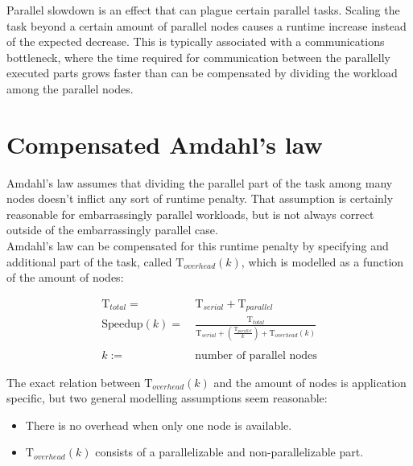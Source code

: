 \hspace{4mm} Parallel slowdown is an effect that can plague certain parallel tasks.\autocite[]{wiki_parsl} Scaling the task beyond a certain amount of parallel nodes causes a runtime increase instead of the expected decrease. This is typically associated with a communications bottleneck, where the time required for communication between the parallelly executed parts grows faster than can be compensated by dividing the workload among the parallel nodes.

\newpage

\section{Compensated Amdahl's law}

\hspace{4mm}Amdahl's law assumes that dividing the parallel part of the task among many nodes doesn't inflict any sort of runtime penalty. That assumption is certainly reasonable for embarrassingly parallel workloads, but is not always correct outside of the embarrassingly parallel case.\\

\noindent Amdahl's law can be compensated for this runtime penalty by specifying and additional part of the task, called $\text{T}_{overhead}(k)$, which is modelled as a function of the amount of nodes:

\begin{equation} \label{Amd 2 eq.}
    \begin{split}
        \text{T}_{total} = & \ \text{T}_{serial} + \text{T}_{parallel}\\
        \text{Speedup}(k) = & \ \frac{\text{T}_{total}}{\text{T}_{serial} + (\frac{\text{T}_{parallel}}{k}) + \text{T}_{overhead}(k)}\\
        \\
        k := & \ \text{number of parallel nodes}
    \end{split}
\end{equation}

\vspace{2mm}

\noindent The exact relation between $\text{T}_{overhead}(k)$ and the amount of nodes is application specific, but two general modelling assumptions seem reasonable:

\begin{itemize}
    \item There is no overhead when only one node is available.
    \item $\text{T}_{overhead}(k)$ consists of a parallelizable and non-parallelizable part.
\end{itemize}

